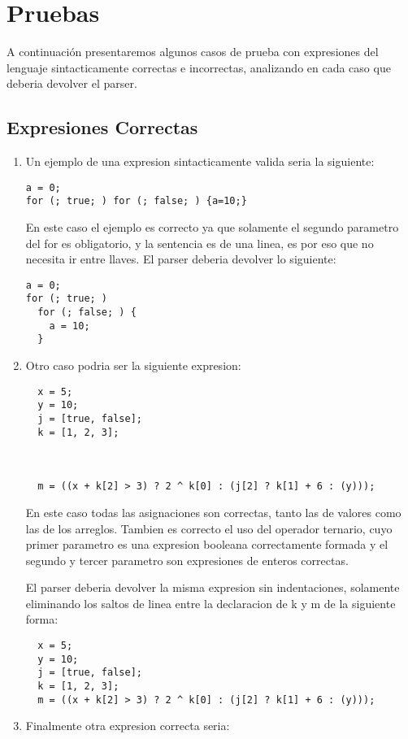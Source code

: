 \section{Pruebas}
A continuación presentaremos algunos casos de prueba con expresiones del
lenguaje sintacticamente correctas e incorrectas, analizando en cada caso que
deberia devolver el parser.

\subsection{Expresiones Correctas}
\begin{enumerate}
\item
Un ejemplo de una expresion sintacticamente valida seria la siguiente:
\begin{verbatim}
a = 0;
for (; true; ) for (; false; ) {a=10;}
\end{verbatim}
En este caso el ejemplo es correcto ya que solamente el segundo parametro del
for es obligatorio, y la sentencia es de una linea, es por eso que no
necesita ir entre llaves. El parser deberia devolver lo siguiente:
\begin{verbatim}
a = 0;
for (; true; )
  for (; false; ) {
    a = 10;
  }
\end{verbatim}

\item Otro caso podria ser la siguiente expresion:
  \begin{verbatim}
  x = 5;
  y = 10;
  j = [true, false];
  k = [1, 2, 3];
 


  m = ((x + k[2] > 3) ? 2 ^ k[0] : (j[2] ? k[1] + 6 : (y)));
  \end{verbatim}
  En este caso todas las asignaciones son correctas, tanto las de valores como
  las de los arreglos. Tambien es correcto el uso del operador ternario, cuyo
  primer parametro es una expresion booleana correctamente formada y el segundo
  y tercer parametro son expresiones de enteros correctas.

  El parser deberia devolver la misma expresion sin indentaciones, solamente
  eliminando los saltos de linea entre la declaracion de k y m de la siguiente
  forma:
\begin{verbatim}
  x = 5;
  y = 10;
  j = [true, false];
  k = [1, 2, 3];
  m = ((x + k[2] > 3) ? 2 ^ k[0] : (j[2] ? k[1] + 6 : (y)));
  \end{verbatim}


\item Finalmente otra expresion correcta seria:


\end{enumerate}
